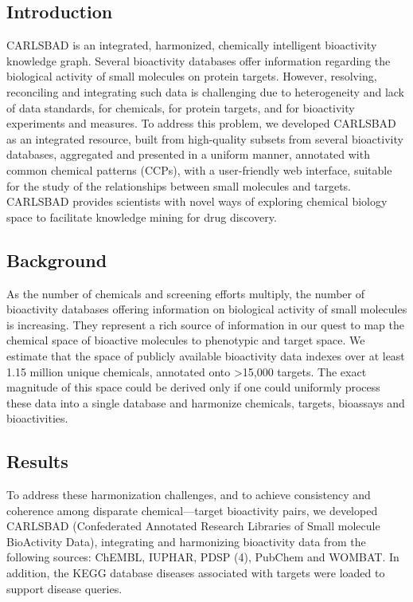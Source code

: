 \subsection{Introduction}

CARLSBAD is an integrated, harmonized, chemically intelligent bioactivity knowledge graph. Several bioactivity databases offer information regarding the biological activity of small molecules on protein targets. However, resolving, reconciling and integrating such data is challenging due to heterogeneity and lack of data standards, for chemicals, for protein targets, and for bioactivity experiments and measures. To address this problem, we developed CARLSBAD as an integrated resource, built from high-quality subsets from several bioactivity databases, aggregated and presented in a uniform manner, annotated with common chemical patterns (CCPs), with a user-friendly web interface, suitable for the study of the relationships between small molecules and targets. CARLSBAD provides scientists with novel ways of exploring chemical biology space to facilitate knowledge mining for drug discovery. 

\subsection{Background}

As the number of chemicals and screening efforts multiply, the number of bioactivity databases offering information on biological activity of small molecules is increasing. They represent a rich source of information in our quest to map the chemical space of bioactive molecules to phenotypic and target space. We estimate that the space of publicly available bioactivity data indexes over at least 1.15 million unique chemicals, annotated onto \textgreater 15,000 targets\cite{Kim_Kjaerulff2013-hi}. The exact magnitude of this space could be derived only if one could uniformly process these data into a single database and harmonize chemicals, targets, bioassays and bioactivities. 

\subsection{Results}

To address these harmonization challenges, and to achieve consistency and coherence among disparate chemical—target bioactivity pairs, we developed CARLSBAD (Confederated Annotated Research Libraries of Small molecule BioActivity Data), integrating and harmonizing bioactivity data from the following sources: ChEMBL\cite{Gaulton2017-gp}, IUPHAR\cite{Harding2018-ut}, PDSP\cite{Roth2000-bh} (4), PubChem\cite{Kim2021-dv} and WOMBAT\cite{Olah2005-zd}. In addition, the KEGG database\cite{Ogata1999-he} diseases associated with targets were loaded to support disease queries.

